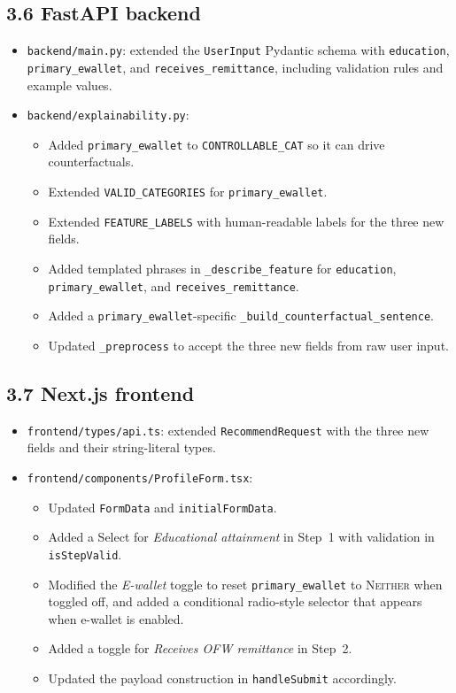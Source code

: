 \documentclass[11pt,a4paper]{article}
\begin{document}
\subsection*{3.6 FastAPI backend}

\begin{itemize}
    \item \texttt{backend/main.py}: extended the \texttt{UserInput}
    Pydantic schema with \texttt{education}, \texttt{primary\_ewallet},
    and \texttt{receives\_remittance}, including validation rules and
    example values.
    \item \texttt{backend/explainability.py}:
    \begin{itemize}
        \item Added \texttt{primary\_ewallet} to \texttt{CONTROLLABLE\_CAT}
        so it can drive counterfactuals.
        \item Extended \texttt{VALID\_CATEGORIES} for
        \texttt{primary\_ewallet}.
        \item Extended \texttt{FEATURE\_LABELS} with human-readable
        labels for the three new fields.
        \item Added templated phrases in \texttt{\_describe\_feature}
        for \texttt{education}, \texttt{primary\_ewallet}, and
        \texttt{receives\_remittance}.
        \item Added a \texttt{primary\_ewallet}-specific
        \texttt{\_build\_counterfactual\_sentence}.
        \item Updated \texttt{\_preprocess} to accept the three new
        fields from raw user input.
    \end{itemize}
\end{itemize}

\subsection*{3.7 Next.js frontend}

\begin{itemize}
    \item \texttt{frontend/types/api.ts}: extended
    \texttt{RecommendRequest} with the three new fields and their
    string-literal types.
    \item \texttt{frontend/components/ProfileForm.tsx}:
    \begin{itemize}
        \item Updated \texttt{FormData} and \texttt{initialFormData}.
        \item Added a Select for \emph{Educational attainment} in
        Step~1 with validation in \texttt{isStepValid}.
        \item Modified the \emph{E-wallet} toggle to reset
        \texttt{primary\_ewallet} to \textsc{Neither} when toggled off,
        and added a conditional radio-style selector that appears when
        e-wallet is enabled.
        \item Added a toggle for \emph{Receives OFW remittance} in
        Step~2.
        \item Updated the payload construction in \texttt{handleSubmit}
        accordingly.
    \end{itemize}
\end{itemize}
\end{document}
